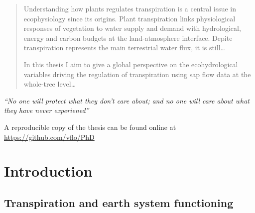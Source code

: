 \documentclass[11pt,twoside]{reedthesis}
\begin{document}
  \hypersetup{linkcolor=black}
  \setcounter{tocdepth}{2}
  \tableofcontents

  \listoftables

  \listoffigures
  \begin{abstract}
    \setlength{\parindent}{30pt} Understanding how plants regulates
    transpiration is a central issue in ecophysiology since its origins.
    Plant transpiration links physiological responses of vegetation to water
    supply and demand with hydrological, energy and carbon budgets at the
    land-atmosphere interface. Depite transpiration represents the main
    terrestrial water flux, it is still\ldots{} \par
    
    In this thesis I aim to give a global perspective on the ecohydrological
    variables driving the regulation of transpiration using sap flow data at
    the whole-tree level\ldots{}\par
  \end{abstract}
  \begin{dedication}
    \vspace*{4.5cm}
    \begin{flushright}
    \hfil \textit{“No one will protect what they don't care about;} \break
    \hfil \textit{and no one will care about what they have never experiened”} \break
    \hfil \textit{} \break
    \hfil {}
    \end{flushright}
    \vspace*{\fill}
  \end{dedication}
\mainmatter %
\pagestyle{fancyplain} %

\setlength{\parindent}{30pt}
\setlength{\parskip}{0.4cm plus4mm minus3mm} \vspace*{4.5cm} A
reproducible copy of the thesis can be found online at
\url{https://github.com/vflo/PhD} \vspace*{\fill}

\captionsetup[figure]{font=small} \setlength{\parindent}{30pt}
\setlength{\parskip}{0.2cm plus4mm minus3mm}

\chapter{Introduction}\label{introduction}

\newpage

\section{Transpiration and earth system
functioning}\label{transpiration-and-earth-system-functioning}
\end{document}
